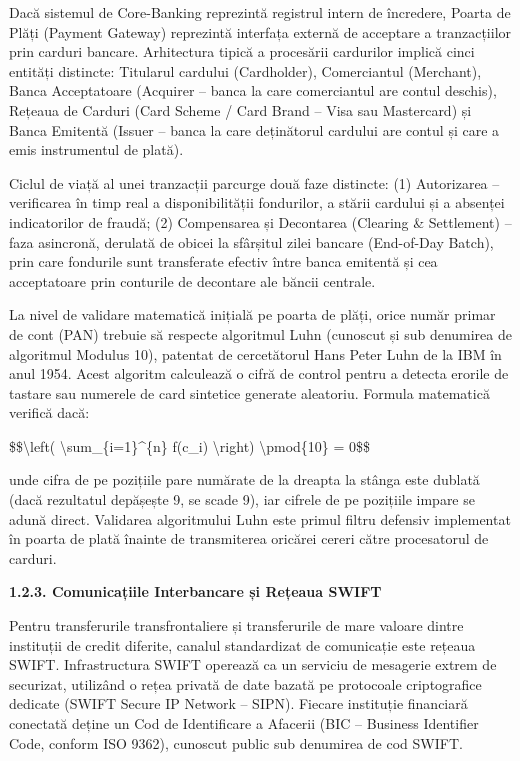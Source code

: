 \documentclass[
]{article}
\begin{document}
Dacă sistemul de Core-Banking reprezintă registrul intern de încredere,
Poarta de Plăți (Payment Gateway) reprezintă interfața externă de
acceptare a tranzacțiilor prin carduri bancare. Arhitectura tipică a
procesării cardurilor implică cinci entități distincte: Titularul
cardului (Cardholder), Comerciantul (Merchant), Banca Acceptatoare
(Acquirer -- banca la care comerciantul are contul deschis), Rețeaua de
Carduri (Card Scheme / Card Brand -- Visa sau Mastercard) și Banca
Emitentă (Issuer -- banca la care deținătorul cardului are contul și
care a emis instrumentul de plată).

Ciclul de viață al unei tranzacții parcurge două faze distincte: (1)
Autorizarea -- verificarea în timp real a disponibilității fondurilor, a
stării cardului și a absenței indicatorilor de fraudă; (2) Compensarea
și Decontarea (Clearing \& Settlement) -- faza asincronă, derulată de
obicei la sfârșitul zilei bancare (End-of-Day Batch), prin care
fondurile sunt transferate efectiv între banca emitentă și cea
acceptatoare prin conturile de decontare ale băncii centrale.

La nivel de validare matematică inițială pe poarta de plăți, orice număr
primar de cont (PAN) trebuie să respecte algoritmul Luhn (cunoscut și
sub denumirea de algoritmul Modulus 10), patentat de cercetătorul Hans
Peter Luhn de la IBM în anul 1954. Acest algoritm calculează o cifră de
control pentru a detecta erorile de tastare sau numerele de card
sintetice generate aleatoriu. Formula matematică verifică dacă:

\$\$\textbackslash left( \textbackslash sum\_\{i=1\}\^{}\{n\} f(c\_i)
\textbackslash right) \textbackslash pmod\{10\} = 0\$\$

unde cifra de pe pozițiile pare numărate de la dreapta la stânga este
dublată (dacă rezultatul depășește 9, se scade 9), iar cifrele de pe
pozițiile impare se adună direct. Validarea algoritmului Luhn este
primul filtru defensiv implementat în poarta de plată înainte de
transmiterea oricărei cereri către procesatorul de carduri.

\textbf{1.2.3. Comunicațiile Interbancare și Rețeaua SWIFT}

Pentru transferurile transfrontaliere și transferurile de mare valoare
dintre instituții de credit diferite, canalul standardizat de
comunicație este rețeaua SWIFT. Infrastructura SWIFT operează ca un
serviciu de mesagerie extrem de securizat, utilizând o rețea privată de
date bazată pe protocoale criptografice dedicate (SWIFT Secure IP
Network -- SIPN). Fiecare instituție financiară conectată deține un Cod
de Identificare a Afacerii (BIC -- Business Identifier Code, conform ISO
9362), cunoscut public sub denumirea de cod SWIFT.
\end{document}
